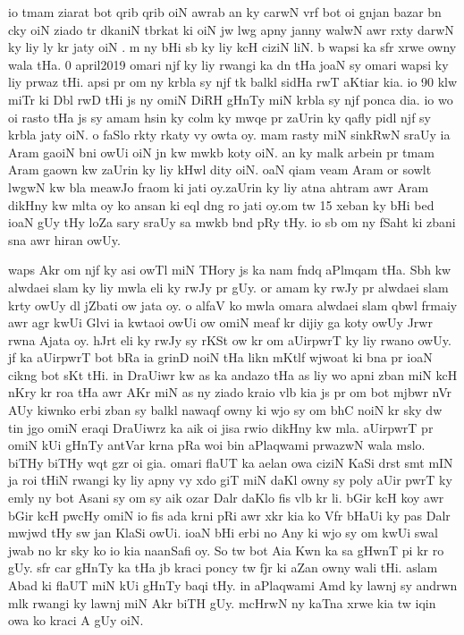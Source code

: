 \documentclass[a4paper]{article}
\begin{document}
io tmam ziarat bot qrib qrib oiN awrab an ky carwN vrf bot oi gnjan bazar bn cky oiN ziado tr dkaniN tbrkat ki oiN jw lwg apny janny  walwN awr rxty darwN ky liy ly kr jaty oiN .
m ny bHi sb  ky liy kcH ciziN liN.
b wapsi ka sfr xrwe owny wala tHa.
0 april2019 omari njf ky liy rwangi ka dn tHa joaN sy omari wapsi ky liy prwaz tHi.
apsi pr om ny krbla sy njf tk balkl sidHa rwT aKtiar kia.
io 90 klw miTr ki Dbl rwD tHi js ny omiN  DiRH gHnTy miN krbla sy njf ponca dia.
io wo oi rasto tHa js sy amam hsin ky colm ky mwqe pr zaUrin ky qafly pidl njf sy krbla jaty oiN.
o faSlo rkty rkaty vy owta oy.
mam rasty miN sinkRwN sraUy ia Aram gaoiN bni owUi oiN jn kw mwkb koty oiN.
an ky malk arbein pr tmam Aram gaown kw zaUrin ky liy kHwl dity oiN.
oaN qiam veam Aram or sowlt lwgwN kw bla meawJo fraom ki jati oy.zaUrin ky liy atna ahtram awr Aram dikHny kw mlta oy ko ansan ki eql dng ro jati oy.om tw  15 xeban ky bHi bed  ioaN gUy tHy loZa sary sraUy sa mwkb bnd pRy tHy. io sb om ny fSaht ki zbani sna awr hiran owUy.

waps Akr om njf ky asi owTl miN THory js ka nam fndq aPlmqam tHa.
Sbh  kw alwdaei slam ky liy mwla eli ky rwJy pr gUy.
or amam ky rwJy pr alwdaei slam krty owUy dl jZbati ow jata oy.
o alfaV ko mwla  omara alwdaei slam  qbwl frmaiy awr agr kwUi Glvi ia kwtaoi owUi ow omiN meaf kr dijiy ga koty owUy Jrwr rwna Ajata oy.
hJrt eli ky rwJy sy rKSt ow kr om aUirpwrT ky liy rwano owUy.
jf ka aUirpwrT bot bRa ia grinD noiN tHa likn mKtlf wjwoat ki bna pr ioaN cikng bot sKt tHi.
in DraUiwr kw as ka andazo tHa as liy wo apni zban miN kcH nKry kr roa tHa awr AKr miN as ny ziado kraio vlb kia js pr om bot mjbwr nVr AUy kiwnko erbi zban sy balkl nawaqf owny ki wjo sy om bhC noiN kr sky dw tin jgo omiN eraqi DraUiwrz ka aik oi jisa rwio dikHny kw mla.
aUirpwrT pr omiN kUi gHnTy antVar krna pRa  woi  bin aPlaqwami prwazwN wala mslo.
biTHy biTHy wqt gzr oi gia.
omari flaUT ka aelan owa ciziN KaSi drst smt  mIN ja roi tHiN rwangi ky liy apny vy xdo giT miN daKl owny sy poly aUir pwrT ky emly ny bot Asani sy om sy  aik ozar Dalr daKlo fis vlb kr li.
bGir kcH  koy awr bGir kcH pwcHy omiN io fis ada krni pRi awr xkr kia ko Vfr bHaUi ky pas  Dalr mwjwd tHy sw jan KlaSi owUi.
ioaN bHi erbi no Any ki wjo sy om kwUi swal jwab no kr sky ko io kia naanSafi oy.
So tw bot Aia Kwn ka sa gHwnT pi kr ro gUy.
sfr car gHnTy ka tHa jb kraci poncy tw fjr ki aZan owny wali tHi.
aslam Abad  ki flaUT miN kUi gHnTy baqi tHy.
in aPlaqwami Amd ky lawnj sy andrwn mlk rwangi ky lawnj miN Akr biTH gUy.
mcHrwN ny kaTna xrwe kia tw iqin owa ko kraci A gUy oiN.
\end{document}

